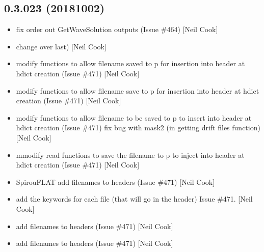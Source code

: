 \documentclass[a4paper,10pt,english]{report}
\begin{document}
\subsection{0.3.023 (2018\sphinxhyphen{}10\sphinxhyphen{}02)}
\label{\detokenize{misc/changelog:id328}}\begin{itemize}
\item {} 
 \sphinxhyphen{} fix order out GetWaveSolution outputs (Issue
\#464) {[}Neil Cook{]}

\item {} 
 \sphinxhyphen{} change over  last) {[}Neil Cook{]}

\item {} 
 \sphinxhyphen{} modify functions to allow filename saved to p \sphinxhyphen{}
for insertion into header at hdict creation (Issue  \#471) {[}Neil Cook{]}

\item {} 
 \sphinxhyphen{} modify functions to allow filename save to p \sphinxhyphen{} for
insertion into header at hdict creation (Issue  \#471) {[}Neil Cook{]}

\item {} 
 \sphinxhyphen{} modify functions to allow filename to be saved to p \sphinxhyphen{}
to insert into header at hdict creation (Issue  \#471) \sphinxhyphen{} fix bug with
mask2 (in getting drift files function) {[}Neil Cook{]}

\item {} 
 \sphinxhyphen{} mmodify read functions to save the filename to p \sphinxhyphen{} to
inject into header at hdict creation (Issue  \#471) {[}Neil Cook{]}

\item {} 
SpirouFLAT \sphinxhyphen{} add filenames to headers (Issue  \#471) {[}Neil Cook{]}

\item {} 
 \sphinxhyphen{} add the keywords for each file (that will go in
the header) \sphinxhyphen{} Issue  \#471. {[}Neil Cook{]}

\item {} 
 \sphinxhyphen{} add filenames to headers (Issue  \#471) {[}Neil Cook{]}

\item {} 
 \sphinxhyphen{} add filenames to headers (Issue  \#471)
{[}Neil Cook{]}


\end{itemize}
\end{document}
